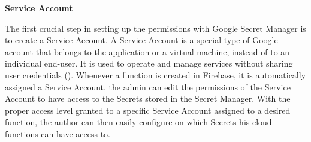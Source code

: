 \textbf{Service Account}

The first crucial step in setting up the permissions with Google Secret Manager is to create a Service Account. A Service Account is
a special type of Google account that belongs to the application or a virtual machine, instead of to an individual end-user. It is
used to operate and manage services without sharing user credentials (\textit{\cite{serviceAccounts}}). Whenever a function is created
in Firebase, it is automatically assigned a Service Account, the admin can edit the permissions of the Service Account to have access
to the Secrets stored in the Secret Manager. With the proper access level granted to a specific Service Account assigned to a desired
function, the author can then easily configure on which Secrets his cloud functions can have access to.





